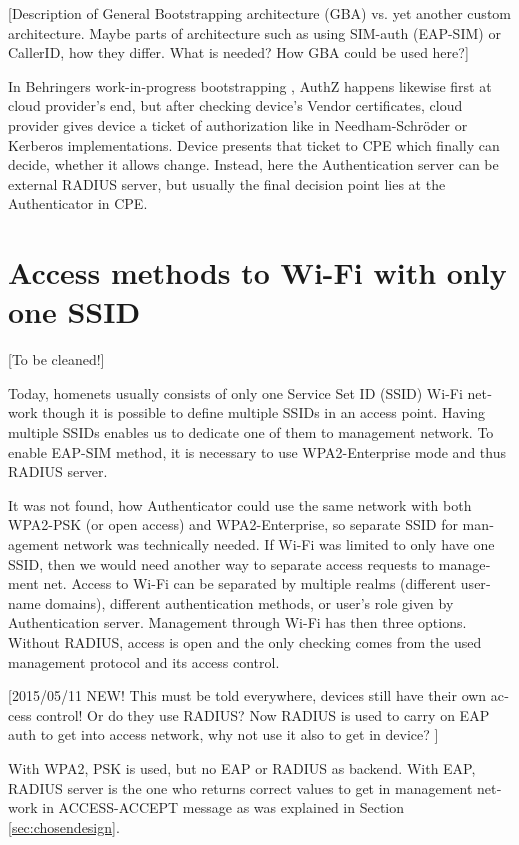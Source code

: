 \documentclass[12pt,a4paper,english]{tutthesis}
\begin{document}
\begin{otherlanguage}{english}
[Description of General Bootstrapping architecture (GBA) vs. yet
another custom architecture. Maybe parts of architecture
such as using SIM-auth (EAP-SIM) or CallerID, how they differ. 
What is needed? How GBA could be used here?]


In Behringers work-in-progress  bootstrapping \cite{draft-behringer-bootstrap},
AuthZ happens likewise first at cloud provider's
end, but after checking device's Vendor certificates, cloud provider
gives device a ticket of authorization like in Needham-Schröder or
Kerberos implementations. Device presents that ticket to CPE which
finally can decide, whether it allows change. 
Instead, here the Authentication server can be external RADIUS server,
but usually the final decision point lies at the Authenticator in CPE.


\section{Access methods to Wi-Fi with only one SSID}
\label{sec-4-5}

[To be cleaned!]

Today, homenets usually consists of only one Service Set ID (SSID)
Wi-Fi network though it is possible to define multiple SSIDs in
an access point. Having multiple SSIDs enables us to dedicate one of them
to management network. 
To enable EAP-SIM method, it is necessary to use WPA2-Enterprise mode
and thus RADIUS server.

It was not found, how Authenticator could use the same network with
both WPA2-PSK (or open access) and WPA2-Enterprise, so
separate SSID for management network was technically needed.
If Wi-Fi was limited to only have one SSID, then we would need another
way to separate access requests to management net.  Access to Wi-Fi
can be separated by multiple realms (different username domains),
different authentication methods, or user's role
given by Authentication server. Management through Wi-Fi has then three
options.  Without RADIUS, access is open and the only checking comes
from the used management protocol and its access control.

[2015/05/11 NEW! This must be told everywhere, devices still have their own access
control! Or do they use RADIUS? Now RADIUS is used to carry on EAP auth to get into access
network, why not use it also to get in device? ]

With WPA2, PSK is used, but no EAP or RADIUS as backend.  With EAP,
RADIUS server is the one who returns correct values to get in
management network in ACCESS-ACCEPT message as was
explained in Section \ref{sec:chosendesign}.



\end{otherlanguage}
\end{document}
